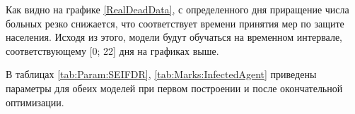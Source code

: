 Как видно на графике \ref{RealDeadData}, с определенного дня приращение числа больных резко снижается, что соответствует времени принятия мер по защите населения. Исходя из этого, модели будут обучаться на временном интервале, соответствующему  [0; 22] дня на графиках выше.

В таблицах \ref{tab:Param:SEIFDR}, \ref{tab:Marks:InfectedAgent}  приведены параметры для обеих моделей при первом построении и после окончательной оптимизации.

\begin{table}[H]
	\renewcommand{\thetable}{\thesubsection.\arabic{table}}
\end{table}
